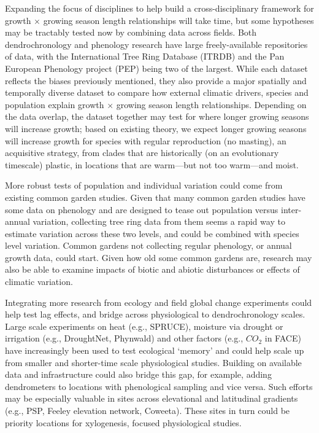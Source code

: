 \documentclass[11pt]{article}
\begin{document}
Expanding the focus of disciplines to help build a cross-disciplinary framework for growth $\times$ growing season length relationships will take time, but some hypotheses may be tractably tested now by combining data across fields. Both dendrochronology and phenology research have large freely-available repositories of data, with the International Tree Ring Database (ITRDB) and the Pan European Phenology project (PEP) being two of the largest. While each dataset reflects the biases previously mentioned, they also provide a major spatially and temporally diverse dataset to compare how external climatic drivers, species and population explain growth $\times$ growing season length relationships. Depending on the data overlap, the dataset together may test for where longer growing seasons will increase growth; based on existing theory, we expect longer growing seasons will increase growth for species with regular reproduction (no masting), an acquisitive strategy, from clades that are historically (on an evolutionary timescale) plastic, in locations that are warm---but not too warm---and moist. %

More robust tests of population and individual variation could come from existing common garden studies. Given that many common garden studies have some data on phenology and are designed to tease out population versus inter-annual variation, collecting tree ring data from them seems a rapid way to estimate variation across these two levels, and could be combined with species level variation. Common gardens not collecting regular phenology, or annual growth data, could start. Given how old some common gardens are, research may also be able to examine impacts of biotic and abiotic disturbances or effects of climatic variation. %

Integrating more research from ecology and field global change experiments could help test lag effects, and bridge across physiological to dendrochronology scales. Large scale experiments on heat (e.g., SPRUCE), moisture via drought or irrigation (e.g., DroughtNet, Phynwald) and other factors (e.g., $CO_2$ in FACE) have increasingly been used to test ecological `memory' and could help scale up from smaller and shorter-time scale physiological studies. Building on available data and infrastructure could also bridge this gap, for example, adding dendrometers to locations with phenological sampling and vice versa. Such efforts may be especially valuable in sites across elevational and latitudinal gradients (e.g., PSP, Feeley elevation network, Coweeta). These sites in turn could be priority locations for xylogenesis, focused physiological studies. 
\end{document}
